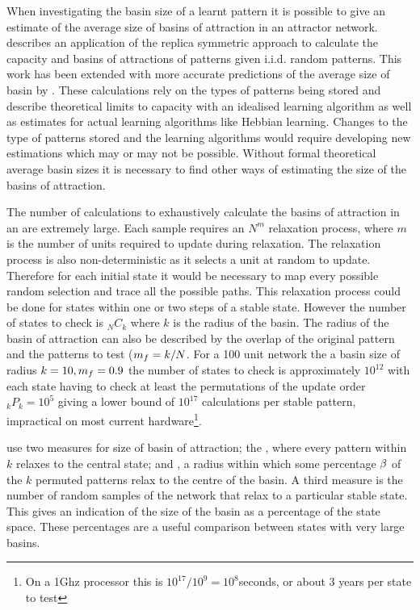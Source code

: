 When investigating the basin size of a learnt pattern it is possible to give an estimate of the average size of basins of attraction in an attractor network. \citet{Gardner1988} describes an application of the replica symmetric approach to calculate the capacity and basins of attractions of patterns given i.i.d. random patterns.  This work has been extended with more accurate predictions of the average size of basin by \citet{Koyama1996,Okada1996}.  These calculations rely on the types of patterns being stored and describe theoretical limits to capacity with an idealised learning algorithm as well as estimates for actual learning algorithms like Hebbian learning.  Changes to the type of patterns stored and the learning algorithms would require developing new estimations which may or may not be possible.  Without formal theoretical average basin sizes it is necessary to find other ways of estimating the size of the basins of attraction.

The number of calculations to exhaustively calculate the basins of attraction in an  are extremely large. Each sample requires an \(N^m\) relaxation process, where \(m\) is the number of units required to update during relaxation.  The relaxation process is also non-deterministic as it selects a unit at random to update.  Therefore for each initial state it would be necessary to map every possible random selection and trace all the possible paths.  This relaxation process could be done for states within one or two steps of a stable state.  However the number of states to check is ${}_{N}C_{k}$ where $k$ is the radius of the basin.  The radius of the basin of attraction can also be described by the overlap of the original pattern and the patterns to test \overlap ($m_f = k/N$.  For a 100 unit network the a basin size of radius $k=10, m_f=0.9$ the number of states to check is approximately $10^{12}$ with each state having to check at least the permutations of the update order ${}_{k}P_{k} = 10^{5}$ giving a lower bound of $10^{17}$ calculations per stable pattern, impractical on most current hardware\footnote{On a 1Ghz processor this is $10^{17}/10^{9} = 10^8$seconds, or about 3 years per state to test}.

\citet{Storkey99} use two measures for size of basin of attraction; the , where every pattern within \(k\) relaxes to the central state; and , a radius within which some percentage \(\beta\) of the \(k\) permuted patterns relax to the centre of the basin.  A third measure is the number of random samples of the network that relax to a particular stable state.  This gives an indication of the size of the basin as a percentage of the state space.  These percentages are a useful comparison between states with very large basins.

